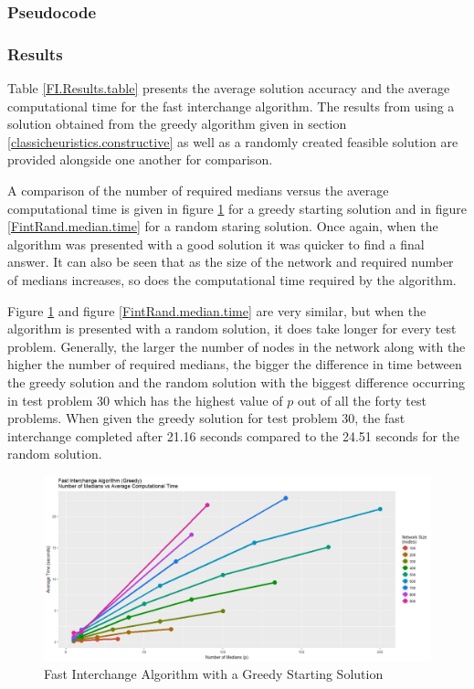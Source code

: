 \documentclass[11pt]{article}
\begin{document}
	\subsubsection{Pseudocode}


	\subsubsection{Results}
	Table \ref{FI.Results.table} presents the average solution accuracy and the average computational time for the fast interchange algorithm.  The results from using a solution obtained from the greedy algorithm given in section \ref{classicheuristics.constructive} as well as a randomly created feasible solution are provided alongside one another for comparison.
	
	A comparison of the number of required medians versus the average computational time is given in figure \ref{FintGreedy.median.time} for a greedy starting solution and in figure \ref{FintRand.median.time} for a random staring solution.  Once again, when the algorithm was presented with a good solution it was quicker to find a final answer.  It can also be seen that as the size of the network and required number of medians increases, so does the computational time required by the algorithm.
	
	Figure \ref{FintGreedy.median.time} and figure \ref{FintRand.median.time} are very similar, but when the algorithm is presented with a random solution, it does take longer for every test problem.  Generally, the larger the number of nodes in the network along with the higher the number of required medians, the bigger the difference in time between the greedy solution and the random solution with the biggest difference occurring in test problem 30 which has the highest value of $p$ out of all the forty test problems.  When given the greedy solution for test problem 30, the fast interchange completed after 21.16 seconds compared to the 24.51 seconds for the random solution.
	
	\begin{figure}[H]
		\begin{center}
			\includegraphics[width=15cm]{FintGreedy.png}
			\caption{Fast Interchange Algorithm with a Greedy Starting Solution}
			\label{FintGreedy.median.time}
		\end{center}
	\end{figure}
	
\end{document}
